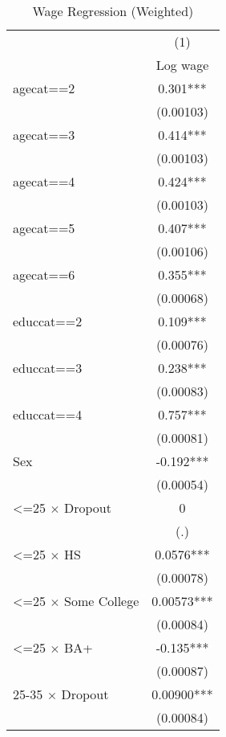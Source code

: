 \begin{table}[htbp]\centering
\def\sym#1{\ifmmode^{#1}\else\(^{#1}\)\fi}
\caption{Wage Regression (Weighted)}
\footnotesize
\begin{tabular}{l*{1}{c}}
\toprule
                    &\multicolumn{1}{c}{(1)}\\
                    &\multicolumn{1}{c}{Log wage}\\
\midrule
agecat==2           &       0.301***\\
                    &   (0.00103)   \\
agecat==3           &       0.414***\\
                    &   (0.00103)   \\
agecat==4           &       0.424***\\
                    &   (0.00103)   \\
agecat==5           &       0.407***\\
                    &   (0.00106)   \\
agecat==6           &       0.355***\\
                    &   (0.00068)   \\
educcat==2          &       0.109***\\
                    &   (0.00076)   \\
educcat==3          &       0.238***\\
                    &   (0.00083)   \\
educcat==4          &       0.757***\\
                    &   (0.00081)   \\
Sex                 &      -0.192***\\
                    &   (0.00054)   \\
<=25 $\times$ Dropout&           0   \\
                    &         (.)   \\
<=25 $\times$ HS    &      0.0576***\\
                    &   (0.00078)   \\
<=25 $\times$ Some College&     0.00573***\\
                    &   (0.00084)   \\
<=25 $\times$ BA+   &      -0.135***\\
                    &   (0.00087)   \\
25-35 $\times$ Dropout&     0.00900***\\
                    &   (0.00084)   \\

\end{tabular}
\end{table}
